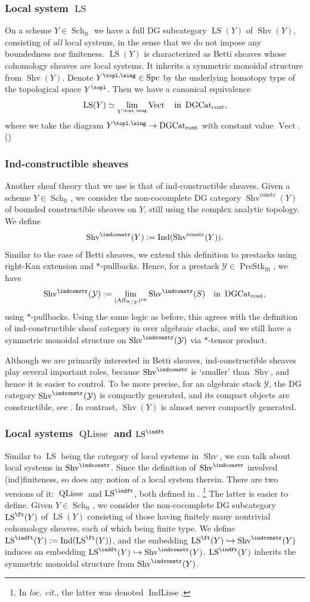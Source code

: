 \documentclass[10pt]{amsart}
\newcommand{\sssec}{\subsubsection}
\theoremstyle{remark}
\newcommand{\te}{\text}
\newcommand{\on}{\operatorname}
\newcommand{\cY}{\mathcal{Y}}
\newcommand{\DGcat}{\on{DGCat}_{\on{cont}}}
\newcommand{\Vect}{\on{Vect}}
\newcommand{\Shv}{\on{Shv}}
\newcommand{\LS}{\on{LS}}
\newcommand{\QLisse}{\on{QLisse}}
\newcommand{\PreStklft}{\on{PreStk}_{\on{lft}}}
\newcommand{\Affft}{\on{Aff}_{\on{ft}}}
\newcommand{\Schft}{\on{Sch}_{\on{ft}}}
\newcommand{\Spc}{\on{Spc}}
\DeclareMathOperator{\Ind}{Ind}
\DeclareMathOperator{\op}{op}
\begin{document}
\sssec{Local system $\LS$}
On a scheme $Y\in\Schft$ we have a full DG subcategory $\LS(Y)$ of $\Shv(Y)$, consisting of \emph{all} local systems, in the sense that we do not impose any boundedness nor finiteness. $\LS(Y)$ is characterized as Betti sheaves whose cohomology sheaves are local systems. It inherits a symmetric monoidal structure from $\Shv(Y)$. Denote $Y^{\topl,\sing}\in\Spc$ by the underlying homotopy type of the topological space $Y^{\topl}$. Then we have a canonical equivalence
\[\LS(Y)\simeq\lim_{Y^{\topl,\sing}}\Vect \quad\te{in }\DGcat,\]
where we take the diagram $Y^{\topl,\sing}\rightarrow \DGcat$ with constant value $\Vect$. (\cite[Lemma A.4.2]{GKRV})

\sssec{Ind-constructible sheaves}
Another sheaf theory that we use is that of ind-constructible sheaves. Given a scheme $Y\in\Schft$, we consider the non-cocomplete DG category $\Shv^{\on{constr}}(Y)$ of bounded constructible sheaves on $Y$, still using the complex analytic topology. We define 
\[\Shv^{\indconstr}(Y):=\Ind(\Shv^{\on{constr}}(Y)).\]
Similar to the case of Betti sheaves, we extend this definition to prestacks using right-Kan extension and $*$-pullbacks. Hence, for a prestack $\cY\in\PreStklft$, we have
\begin{equation}\label{eq: Shvindconstr via a RKE}
    \Shv^{\indconstr}(\cY):=\lim_{({\Affft}_{/\cY})^{\op}}\Shv^{\indconstr}(S)\quad\te{in }\DGcat,
\end{equation}
using $*$-pullbacks. Using the same logic as before, this agrees with the definition of ind-constructible sheaf category in \cite[Sect. A.1]{GKRV} over algebraic stacks, and we still have a symmetric monoidal structure on $\Shv^{\indconstr}(\cY)$ via $*$-tensor product.
\medskip

Although we are primarily interested in Betti sheaves, ind-constructible sheaves play several important roles, because $\Shv^{\indconstr}$ is `smaller' than $\Shv$, and hence it is easier to control. To be more precise, for an algebraic stack $\cY$, the DG category $\Shv^{\indconstr}(\cY)$ is compactly generated, and its compact objects are constructible, see \cite[Sect. F.1]{AGKRRV}. In contrast, $\Shv(Y)$ is almost never compactly generated.

\sssec{Local systems $\QLisse$ and $\LS^{\indft}$}
Similar to $\LS$ being the category of local systems in $\Shv$, we can talk about local systems in $\Shv^{\indconstr}$. Since the definition of $\Shv^{\indconstr}$ involved (ind)finiteness, so does any notion of a local system therein. There are two versions of it: $\QLisse$ and $\LS^{\indft}$, both defined in \cite[Sect. 1.2]{AGKRRV}. \footnote{In \emph{loc. cit.}, the latter was denoted $\on{IndLisse}$.} The latter is easier to define. Given $Y\in\Schft$, we consider the non-cocomplete DG subcategory $\LS^{\ft}(Y)$ of $\LS(Y)$ consisting of those having finitely many nontrivial cohomology sheaves, each of which being finite type. We define $\LS^{\indft}(Y):=\Ind(\LS^{\ft}(Y))$, and the embedding $\LS^{\ft}(Y)\hookrightarrow \Shv^{\indconstr}(Y)$ induces an embedding $\LS^{\indft}(Y)\hookrightarrow \Shv^{\indconstr}(Y)$. $\LS^{\indft}(Y)$ inherits the symmetric monoidal structure from $\Shv^{\indconstr}(Y)$.
\medskip
\end{document}

